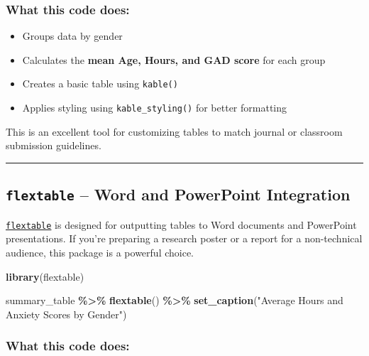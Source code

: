 \documentclass[
]{book}
\newenvironment{Shaded}{\begin{snugshade}}{\end{snugshade}}
\newcommand{\FunctionTok}[1]{\textcolor[rgb]{0.13,0.29,0.53}{\textbf{#1}}}
\newcommand{\NormalTok}[1]{#1}
\newcommand{\SpecialCharTok}[1]{\textcolor[rgb]{0.81,0.36,0.00}{\textbf{#1}}}
\newcommand{\StringTok}[1]{\textcolor[rgb]{0.31,0.60,0.02}{#1}}
\providecommand{\tightlist}{%
  \setlength{\itemsep}{0pt}\setlength{\parskip}{0pt}}
\begin{document}
\subsubsection*{What this code does:}\label{what-this-code-does-2}

\begin{itemize}
\tightlist
\item
  Groups data by gender
\item
  Calculates the \textbf{mean Age, Hours, and GAD score} for each group
\item
  Creates a basic table using \texttt{kable()}
\item
  Applies styling using \texttt{kable\_styling()} for better formatting
\end{itemize}

This is an excellent tool for customizing tables to match journal or classroom submission guidelines.

\begin{center}\rule{0.5\linewidth}{0.5pt}\end{center}

\subsection*{\texorpdfstring{\texttt{flextable} -- Word and PowerPoint Integration}{flextable -- Word and PowerPoint Integration}}\label{flextable-word-and-powerpoint-integration}

\href{https://davidgohel.github.io/flextable/}{\texttt{flextable}} is designed for outputting tables to Word documents and PowerPoint presentations. If you're preparing a research poster or a report for a non-technical audience, this package is a powerful choice.

\begin{Shaded}
\begin{Highlighting}[]
\FunctionTok{library}\NormalTok{(flextable)}

\NormalTok{summary\_table }\SpecialCharTok{\%\textgreater{}\%}
  \FunctionTok{flextable}\NormalTok{() }\SpecialCharTok{\%\textgreater{}\%}
  \FunctionTok{set\_caption}\NormalTok{(}\StringTok{"Average Hours and Anxiety Scores by Gender"}\NormalTok{)}
\end{Highlighting}
\end{Shaded}

\subsubsection*{What this code does:}\label{what-this-code-does-3}
\end{document}
